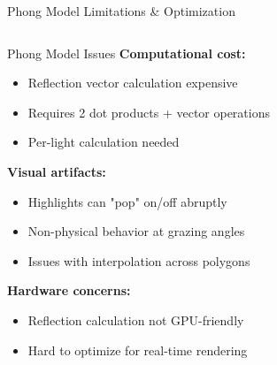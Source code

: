 \begin{frame}{Phong Model Limitations \& Optimization}
  \begin{columns}
    \begin{column}{0.6\textwidth}
      \begin{conceptbox}{Phong Model Issues}
        \textbf{Computational cost:}
        \begin{itemize}
          \item Reflection vector calculation expensive
          \item Requires 2 dot products + vector operations
          \item Per-light calculation needed
        \end{itemize}

        \vspace{0.3cm}
        \pause
        \textbf{Visual artifacts:}
        \begin{itemize}
          \item Highlights can "pop" on/off abruptly
          \item Non-physical behavior at grazing angles
          \item Issues with interpolation across polygons
        \end{itemize}

        \vspace{0.3cm}
        \pause
        \textbf{Hardware concerns:}
        \begin{itemize}
          \item Reflection calculation not GPU-friendly
          \item Hard to optimize for real-time rendering
        \end{itemize}
      \end{conceptbox}
    \end{column}
    \begin{column}{0.4\textwidth}
\end{column}
\end{columns}
\end{frame}

